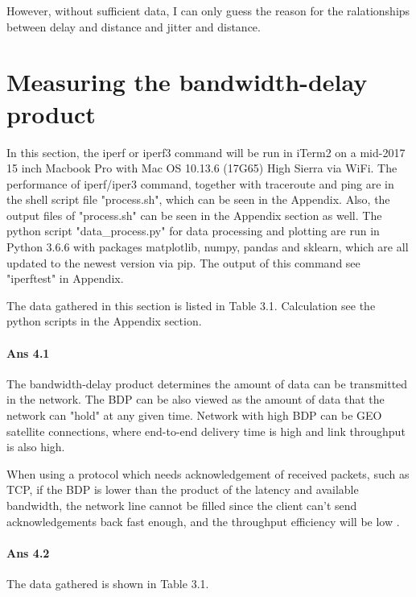 \documentclass[paper=a4, fontsize=10pt]{scrartcl} %
\numberwithin{equation}{section} %
\numberwithin{figure}{section} %
\numberwithin{table}{section} %
\begin{document}
However, without sufficient data, I can only guess the reason for the ralationships between delay and distance and jitter and distance.
\section{Measuring the bandwidth-delay product}

In this section, the iperf or iperf3 command will be run in iTerm2 on a mid-2017 15 inch Macbook Pro with Mac OS 10.13.6 (17G65) High Sierra via WiFi. The performance of iperf/iper3 command, together with traceroute and ping are in the shell script file "process.sh", which can be seen in the Appendix. Also, the output files of "process.sh" can be seen in the Appendix section as well. The python script "data\_process.py" for data processing and plotting are run in Python 3.6.6 with packages matplotlib\cite{hunter2007matplotlib}, numpy\cite{Oliphant:2007:PSC:1251563.1251830}, pandas\cite{mckinneypandas,  mckinney-proc-scipy-2010} and sklearn\cite{sklearn_api}, which are all updated to the newest version via pip.   The output of this command see "iperftest"  in Appendix.

The data gathered in this section is listed in Table 3.1. Calculation see the python scripts in the Appendix section.



\paragraph{Ans 4.1} The bandwidth-delay product determines the amount of data can be transmitted in the network. The BDP can be also viewed as the amount of data that the network can "hold" at any given time. Network with high BDP can be GEO  satellite connections, where end-to-end delivery time is high and link throughput is also high\cite{Chen:2004:UBP:2285778.2286085}.

When using a protocol which needs acknowledgement of received packets, such as TCP, if the BDP is lower than the product of the latency and available bandwidth, the network line cannot be filled since the client can't send acknowledgements back fast enough, and the throughput efficiency will be low \cite{5199079}.


\paragraph{Ans 4.2}

The data gathered is shown in Table 3.1.
\end{document}

